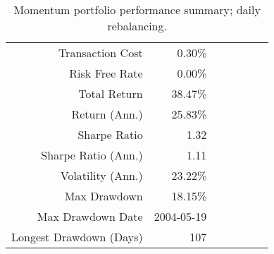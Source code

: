 \begin{table}[p]
\centering
\caption{Momentum portfolio performance summary; daily rebalancing.}
\label{table:mom}
\begin{tabular}{rrrrrrr}
\toprule
\midrule
Transaction Cost & 0.30\% \\
Risk Free Rate & 0.00\% \\
\hline
Total Return & 38.47\% \\
Return (Ann.) & 25.83\% \\
Sharpe Ratio & 1.32 \\
Sharpe Ratio (Ann.) & 1.11 \\
Volatility (Ann.) & 23.22\% \\
Max Drawdown & 18.15\% \\
Max Drawdown Date & 2004-05-19 \\
Longest Drawdown (Days) & 107 \\
\bottomrule
\end{tabular}
\end{table}
